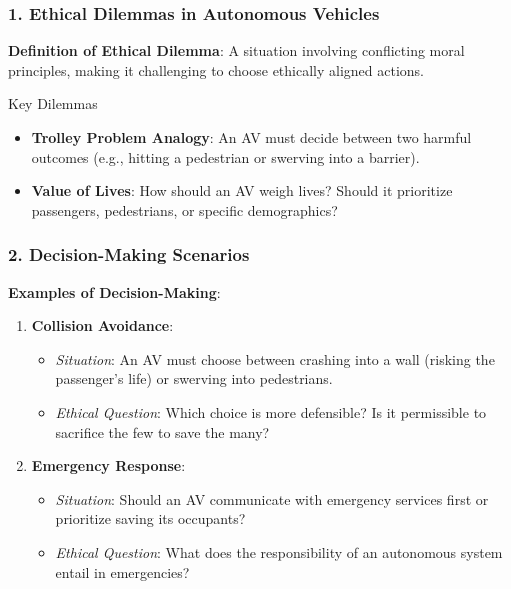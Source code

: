 \documentclass[aspectratio=169]{beamer}
\begin{document}
\begin{frame}[fragile]
    \frametitle{1. Ethical Dilemmas in Autonomous Vehicles}
    \textbf{Definition of Ethical Dilemma}: A situation involving conflicting moral principles, making it challenging to choose ethically aligned actions.

    \begin{block}{Key Dilemmas}
        \begin{itemize}
            \item \textbf{Trolley Problem Analogy}: An AV must decide between two harmful outcomes (e.g., hitting a pedestrian or swerving into a barrier).
            \item \textbf{Value of Lives}: How should an AV weigh lives? Should it prioritize passengers, pedestrians, or specific demographics?
        \end{itemize}
    \end{block}
\end{frame}

\begin{frame}[fragile]
    \frametitle{2. Decision-Making Scenarios}
    \textbf{Examples of Decision-Making}:
    \begin{enumerate}
        \item \textbf{Collision Avoidance}:
            \begin{itemize}
                \item \textit{Situation}: An AV must choose between crashing into a wall (risking the passenger's life) or swerving into pedestrians.
                \item \textit{Ethical Question}: Which choice is more defensible? Is it permissible to sacrifice the few to save the many?
            \end{itemize}
        \item \textbf{Emergency Response}:
            \begin{itemize}
                \item \textit{Situation}: Should an AV communicate with emergency services first or prioritize saving its occupants?
                \item \textit{Ethical Question}: What does the responsibility of an autonomous system entail in emergencies?
            \end{itemize}
    \end{enumerate}
\end{frame}
\end{document}

